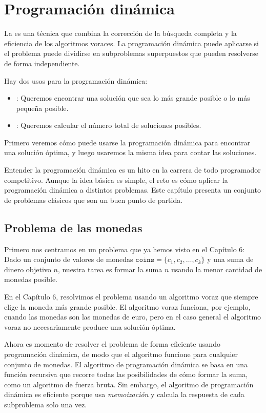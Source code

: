 \chapter{Programación dinámica}


La 
es una técnica que combina la corrección
de la búsqueda completa y la eficiencia
de los algoritmos voraces.
La programación dinámica puede aplicarse si el
problema puede dividirse en subproblemas superpuestos
que pueden resolverse de forma independiente.

Hay dos usos para la programación dinámica:

\begin{itemize}
\item
{}:
Queremos encontrar una solución que sea
lo más grande posible o lo más pequeña posible.
\item
{}:
Queremos calcular el número total de
soluciones posibles.
\end{itemize}

Primero veremos cómo puede usarse la programación dinámica
para encontrar una solución óptima,
y luego usaremos la misma idea para
contar las soluciones.

Entender la programación dinámica es un hito
en la carrera de todo programador competitivo.
Aunque la idea básica es simple,
el reto es cómo aplicar
la programación dinámica a distintos problemas.
Este capítulo presenta un conjunto de problemas clásicos
que son un buen punto de partida.

\section{Problema de las monedas}

Primero nos centramos en un problema que ya
hemos visto en el Capítulo 6:
Dado un conjunto de valores de monedas $\texttt{coins} = \{c_1,c_2,\ldots,c_k\}$
y una suma de dinero objetivo $n$, nuestra tarea es
formar la suma $n$ usando la menor cantidad de monedas posible.

En el Capítulo 6, resolvimos el problema usando un
algoritmo voraz que siempre elige la moneda más grande
posible.
El algoritmo voraz funciona, por ejemplo,
cuando las monedas son las monedas de euro,
pero en el caso general el algoritmo voraz
no necesariamente produce una solución óptima.

Ahora es momento de resolver el problema de forma eficiente
usando programación dinámica, de modo que el algoritmo
funcione para cualquier conjunto de monedas.
El algoritmo de programación dinámica
se basa en una función recursiva
que recorre todas las posibilidades de cómo
formar la suma, como un algoritmo de fuerza bruta.
Sin embargo, el algoritmo de programación dinámica
es eficiente porque
usa \emph{memoización} y
calcula la respuesta de cada subproblema solo una vez.

